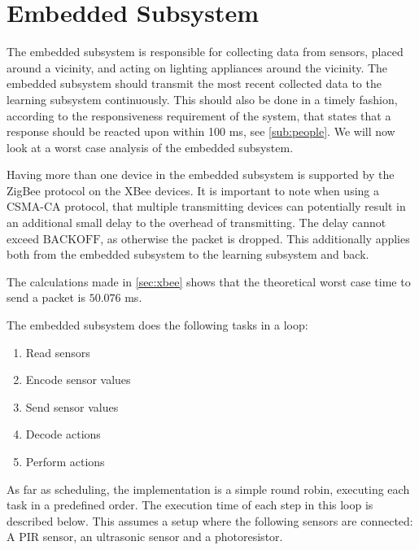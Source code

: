 \section{Embedded Subsystem}\label{sub:sensorStation}

The embedded subsystem is responsible for collecting data from sensors, placed around a vicinity, and acting on lighting appliances around the vicinity. The embedded subsystem should transmit the most recent collected data to the learning subsystem continuously. This should also be done in a timely fashion, according to the responsiveness requirement of the system, that states that a response should be reacted upon within 100 ms, see \cref{sub:people}. We will now look at a worst case analysis of the embedded subsystem.

Having more than one device in the embedded subsystem is supported by the ZigBee\cite{xbee_latency} protocol on the XBee devices. It is important to note when using a CSMA-CA protocol, that multiple transmitting devices can potentially result in an additional small delay to the overhead of transmitting. The delay cannot exceed $\text{BACKOFF}$, as otherwise the packet is dropped. This additionally applies both from the embedded subsystem to the learning subsystem and back.

The calculations made in \cref{sec:xbee} shows that the theoretical worst case time to send a packet is $50.076$ ms.

The embedded subsystem does the following tasks in a loop:
\begin{enumerate}
  \item Read sensors
  \item Encode sensor values
  \item Send sensor values
  \item Decode actions
  \item Perform actions
\end{enumerate}

As far as scheduling, the implementation is a simple round robin, executing each task in a predefined order. The execution time of each step in this loop is described below. This assumes a setup where the following sensors are connected: A PIR sensor, an ultrasonic sensor and a photoresistor.

